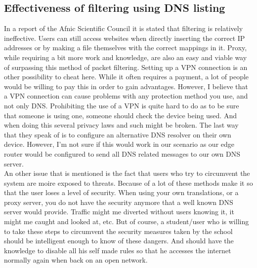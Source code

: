 \subsection{Effectiveness of filtering using DNS listing}
In a report of the Afnic Scientific Council \textcite{COUNCIL} it is stated that filtering is relatively ineffective. Users can still access websites when directly inserting the correct IP addresses or by making a file themselves with the correct mappings in it. Proxy, while requiring a bit more work and knowledge, are also an easy and viable way of surpassing this method of packet filtering. Setting up a VPN connection is an other possibility to cheat here. While it often requires a payment, a lot of people would be willing to pay this in order to gain advantages. However, I believe that a VPN connection can cause problems with any protection method you use, and not only DNS. Prohibiting the use of a VPN is quite hard to do as to be sure that someone is using one, someone should check the device being used. And when doing this several privacy laws and such might be broken. The last way that they speak of is to configure an alternative DNS resolver on their own device. However, I'm not sure if this would work in our scenario as our edge router would be configured to send all DNS related messages to our own DNS server.\\
An other issue that is mentioned is the fact that users who try to circumvent the system are moire exposed to threats. Because of a lot of these methods make it so that the user loses a level of security. When using your own translations, or a proxy server, you do not have the security anymore that a well known DNS server would provide. Traffic might me diverted without users knowing it, it might me caught and looked at, etc. But of course, a student/user who is willing to take these steps to circumvent the security measures taken by the school should be intelligent enough to know of these dangers. And should have the knowledge to disable all his self made rules so that he accesses the internet normally again when back on an open network. 
